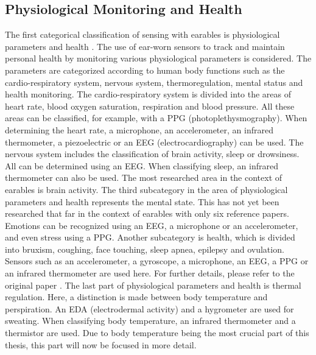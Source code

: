 \subsection{Physiological Monitoring and Health}
\label{Background:SensingWithEarables:Physiological}
The first categorical classification of sensing with earables is physiological parameters and health \cite{roddigerSensingEarablesSystematic2022a}.
The use of ear-worn sensors to track and maintain personal health by monitoring various physiological parameters is considered.
The parameters are categorized according to human body functions such as the cardio-respiratory system, nervous system, thermoregulation, mental status and health monitoring.
The cardio-respiratory system is divided into the areas of heart rate, blood oxygen saturation, respiration and blood pressure.
All these areas can be classified, for example, with a PPG (photoplethysmography). 
When determining the heart rate, a microphone, an accelerometer, an infrared thermometer, a piezoelectric or an EEG (electrocardiography) can be used.
The nervous system includes the classification of brain activity, sleep or drowsiness. 
All can be determined using an EEG. 
When classifying sleep, an infrared thermometer can also be used. 
The most researched area in the context of earables is brain activity.
The third subcategory in the area of physiological parameters and health represents the mental state.
This has not yet been researched that far in the context of earables with only six reference papers.
Emotions can be recognized using an EEG, a microphone or an accelerometer, and even stress using a PPG.
Another subcategory is health, which is divided into bruxism, coughing, face touching, sleep apnea, epilepsy and ovulation.
Sensors such as an accelerometer, a gyroscope, a microphone, an EEG, a PPG or an infrared thermometer are used here.
For further details, please refer to the original paper \cite{roddigerSensingEarablesSystematic2022a}.
The last part of physiological parameters and health is thermal regulation. 
Here, a distinction is made between body temperature and perspiration. An EDA (electrodermal activity) and a hygrometer are used for sweating.
When classifying body temperature, an infrared thermometer and a thermistor are used.
Due to body temperature being the most crucial part of this thesis, this part will now be focused in more detail.

